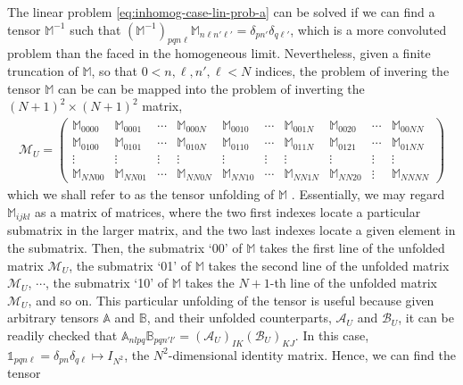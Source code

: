 \documentclass[aps,prd,preprint,nofootinbib,amsmath,amssymb,showpacs,longbibliography,singlecolumn,superscriptaddress,10pt]{revtex4-1}
\theoremstyle{plain}
\theoremstyle{definition}
\begin{document}
The linear problem \eqref{eq:inhomog-case-lin-prob-a} can be solved if we can find a tensor $\mathds{M}^{-1}$ such that $(\mathds{M}^{-1})_{p q n \ell} \mathds{M}_{n \ell n' \ell'} = \delta_{p n'} \delta_{q \ell'}$, which is a more convoluted problem than the faced in the homogeneous limit. Nevertheless, given a finite truncation of $\mathds{M}$, so that $0< n,\ell,n',\ell < N$ indices, the problem of invering the tensor $\mathds{M}$ can be can be mapped into the problem of inverting the $(N+1)^{2} \times (N+1)^{2}$ matrix, 
%
\begin{equation}
\begin{aligned}
\mathcal{M}_{U}
=
\left(
\begin{array}{cccccccccc}
   \mathds{M}_{0000}  & \mathds{M}_{0001} & \cdots & \mathds{M}_{000N} & \mathds{M}_{0010} & \cdots & \mathds{M}_{001N} & \mathds{M}_{0020} &\cdots & \mathds{M}_{00NN}  \\
   \mathds{M}_{0100}  & \mathds{M}_{0101} & \cdots & \mathds{M}_{010N} & \mathds{M}_{0110} & \cdots & \mathds{M}_{011N} & \mathds{M}_{0121} & \cdots & \mathds{M}_{01NN}  \\
   \vdots  & \vdots & \vdots  &\vdots & \vdots & \vdots & \vdots & \vdots & \vdots & \vdots \\
      \mathds{M}_{NN00}  & \mathds{M}_{NN01} & \cdots & \mathds{M}_{NN0N} & \mathds{M}_{NN10} & \cdots & \mathds{M}_{NN1N} & \mathds{M}_{NN20} & \vdots & \mathds{M}_{NNNN} 
   \end{array}
\right)
\end{aligned}    
\end{equation}
%
which we shall refer to as the tensor unfolding of $\mathds{M}$ \cite{}. Essentially, we may regard $\mathds{M}_{ijkl}$ as a matrix of matrices, where the two first indexes locate a particular submatrix in the larger matrix, and the two last indexes locate a given element in the submatrix. Then, the submatrix `00' of $\mathds{M}$ takes the first line of the unfolded matrix $\mathcal{M}_{U}$, the submatrix `01' of $\mathds{M}$ takes the second line of the unfolded matrix $\mathcal{M}_{U}$, $\cdots$, the submatrix `10' of $\mathds{M}$ takes the $N+1$-th line of the unfolded matrix $\mathcal{M}_{U}$, and so on. This particular unfolding of the tensor is useful because given arbitrary tensors $\mathds{A}$ and $\mathds{B}$, and their unfolded counterparts, $\mathcal{A}_{U}$ and $\mathcal{B}_{U}$, it can be readily checked that $ \mathds{A}_{nlpq}\mathds{B}_{pqn'l'} =(\mathcal{A}_{U})_{IK}(\mathcal{B}_{U})_{KJ}$. In this case,  $\mathds{1}_{pqn\ell} = \delta_{p n} \delta_{q \ell} \mapsto I_{N^{2}}$, the $N^{2}$-dimensional identity matrix. Hence, we can find the tensor 
\end{document}
